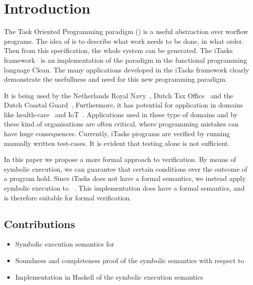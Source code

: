 


\section{Introduction}

The Task Oriented Programming paradigm (\TOP) is a useful abstraction over worflow programs.
The idea of \TOP is to describe what work needs to be done, in what order.
Then from this specification, the whole system can be generated.
The iTasks framework~\cite{DBLP:conf/ppdp/PlasmeijerLMAK12} is an implementation of the paradigm in the functional programming language Clean.
The many applications developed in the iTasks framework clearly demonstrate the usefullness and need for this new programming paradigm.

It is being used by the Netherlands Royal Navy~\cite{jansen2018dynamic}, Dutch Tax Office~\cite{} and the Dutch Coastal Guard~\cite{lijnse2012incidone}. %
Furthermore, it has potential for application in domains like health-care~\cite{} and IoT~\cite{DBLP:conf/cgo/KoopmanLP18}.
Applications used in these type of domains and by these kind of organisations are often critical, where programming mistakes can have huge consequences.
Currently, iTasks programs are verified by running manually written test-cases. %
It is evident that testing alone is not sufficient.

In this paper we propose a more formal approach to verification.
By means of symbolic execution, we can guarantee that certain conditions over the outcome of a \TOP program hold.
Since iTasks does not have a formal semantics, we instead apply symbolic execution to \TOPHAT~\cite{Steenvoorden2019}.
This \TOP implementation does have a formal semantics, and is therefore suitable for formal verification.

\subsection{Contributions}

\begin{itemize}
  \item Symbolic execution semantics for \TOPHAT
  \item Soundness and completeness proof of the symbolic semantics with respect to \TOPHAT
  \item Implementation in Haskell of the symbolic execution semantics
\end{itemize}

